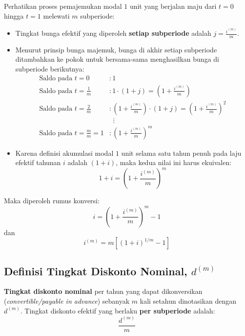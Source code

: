 \documentclass[11pt,a4paper]{article}
\begin{document}
\begin{notebox}
Perhatikan proses pemajemukan modal $1$ unit yang berjalan maju dari $t = 0$ hingga $t = 1$ melewati $m$ subperiode:
\begin{itemize}[leftmargin=1.5em]
    \item Tingkat bunga efektif yang diperoleh \textbf{setiap subperiode} adalah $j = \frac{i^{(m)}}{m}$.
    \item Menurut prinsip bunga majemuk, bunga di akhir setiap subperiode ditambahkan ke pokok untuk bersama-sama menghasilkan bunga di subperiode berikutnya:
    \begin{align*}
        \text{Saldo pada } t = 0 &: 1 \\
        \text{Saldo pada } t = \tfrac{1}{m} &: 1 \cdot (1 + j) = \left(1 + \tfrac{i^{(m)}}{m}\right) \\
        \text{Saldo pada } t = \tfrac{2}{m} &: \left(1 + \tfrac{i^{(m)}}{m}\right) \cdot (1 + j) = \left(1 + \tfrac{i^{(m)}}{m}\right)^2 \\
        &\;\; \vdots \\
        \text{Saldo pada } t = \tfrac{m}{m} = 1 &: \left(1 + \tfrac{i^{(m)}}{m}\right)^m
    \end{align*}
    \item Karena definisi akumulasi modal $1$ unit selama satu tahun penuh pada laju efektif tahunan $i$ adalah $(1 + i)$, maka kedua nilai ini harus ekuivalen:
    \begin{equation*}
        1 + i = \left(1 + \frac{i^{(m)}}{m}\right)^m
    \end{equation*}
\end{itemize}
\end{notebox}

Maka diperoleh rumus konversi:
\begin{equation}
    i = \left( 1 + \frac{i^{(m)}}{m} \right)^m - 1
\end{equation}
dan
\begin{equation}
    i^{(m)} = m \left[ (1 + i)^{1/m} - 1 \right]
\end{equation}

\subsection{Definisi Tingkat Diskonto Nominal, $d^{(m)}$}
\begin{definitionbox}
\textbf{Tingkat diskonto nominal} per tahun yang dapat dikonversikan (\textit{convertible/payable in advance}) sebanyak $m$ kali setahun dinotasikan dengan $d^{(m)}$.
Tingkat diskonto efektif yang berlaku \textbf{per subperiode} adalah:
\begin{equation}
    \frac{d^{(m)}}{m}
\end{equation}
\end{definitionbox}
\end{document}
